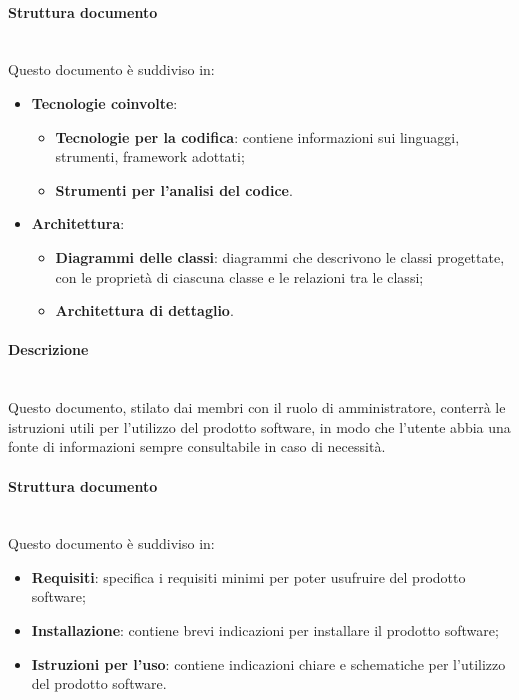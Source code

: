 \paragraph {Struttura documento}\mbox{}\\
Questo documento è suddiviso in:
\begin{itemize}
	\item \textbf{Tecnologie coinvolte}:
	\begin{itemize}
		\item \textbf{Tecnologie per la codifica}: contiene informazioni sui linguaggi, strumenti, framework adottati;
        \item \textbf{Strumenti per l'analisi del codice}.
    \end{itemize}
    \item \textbf{Architettura}:
    \begin{itemize}
		\item \textbf{Diagrammi delle classi}: diagrammi che descrivono le classi progettate, con le proprietà di ciascuna classe e le relazioni tra le classi;
        \item \textbf{Architettura di dettaglio}.
    \end{itemize}
\end{itemize}

\paragraph {Descrizione}\mbox{}\\
Questo documento, stilato dai membri con il ruolo di amministratore, conterrà le istruzioni utili per l'utilizzo del prodotto software, in modo che l'utente abbia una fonte di informazioni sempre consultabile in caso di necessità.
\paragraph {Struttura documento}\mbox{}\\
Questo documento è suddiviso in:
\begin{itemize}
	\item \textbf{Requisiti}: specifica i requisiti minimi per poter usufruire del prodotto software;
    \item \textbf{Installazione}: contiene brevi indicazioni per installare il prodotto software;
    \item \textbf{Istruzioni per l'uso}: contiene indicazioni chiare e schematiche per l'utilizzo del prodotto software.
\end{itemize}

